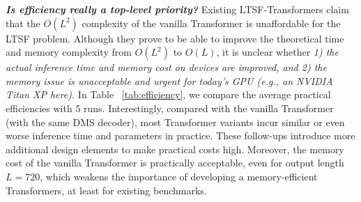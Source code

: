 \begin{table}[h]
\centering
{}
\vspace{-0.2cm}
\caption{The MSE comparison of two training data sizes.}
\vspace{-0.3cm}
\label{tab:shortenTraffic}
\end{table}


\textbf{\emph{Is efficiency really a top-level priority?}}
Existing LTSF-Transformers claim that the $O\left(L^{2}\right)$ complexity of the vanilla Transformer is unaffordable for the LTSF problem. Although they prove to be able to improve the theoretical time and memory complexity from $O\left(L^{2}\right)$ to $O\left(L\right)$, it is unclear whether \emph{1) the actual inference time and memory cost on devices are improved, and 2) the memory issue is unacceptable and urgent for today's GPU (e.g., an NVIDIA Titan XP here).}
%
In Table ~\ref{tab:efficiency}, we compare the average practical efficiencies with 5 runs. Interestingly, compared with the vanilla Transformer (with the same DMS decoder), most Transformer variants incur similar or even worse inference time and parameters in practice. These follow-ups introduce more additional design elements to make practical costs high. Moreover, the memory cost of the vanilla Transformer is practically acceptable, even for output length $L=720$, which weakens the importance of developing a memory-efficient Transformers, at least for existing benchmarks. 


